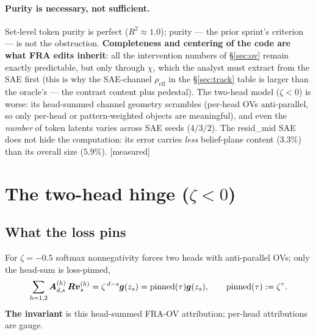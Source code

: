 \documentclass{article}
\newcommand{\gb}{\boldsymbol{g}}
\newcommand{\htag}[1]{{\normalfont\sffamily\footnotesize[#1]}}
\begin{document}
\paragraph{Purity is necessary, not sufficient.} Set-level token purity is perfect
($R^2\approx1.0$); purity --- the prior sprint's criterion --- is not the obstruction.
\textbf{Completeness and centering of the code are what FRA edits inherit}: all the
intervention numbers of \S\ref{sec:ov} remain exactly predictable, but only through
$\chi$, which the analyst must extract from the SAE first (this is why the SAE-channel
$\rho_{\mathrm{eff}}$ in the \S\ref{sec:track} table is larger than the oracle's --- the
contrast content plus pedestal). The two-head model ($\zeta<0$) is worse: its
head-summed channel geometry scrambles (per-head OVs anti-parallel, so only per-head or
pattern-weighted objects are meaningful), and even the \emph{number} of token latents
varies across SAE seeds ($4/3/2$). The resid\_mid SAE does not hide the computation:
its error carries \emph{less} belief-plane content ($3.3\%$) than its overall size
($5.9\%$). \htag{measured}

\section{The two-head hinge ($\zeta<0$)}\label{sec:twohead}

\subsection{What the loss pins}\label{sec:hingepin}

For $\zeta=-0.5$ softmax nonnegativity forces two heads with anti-parallel OVs; only
the head-sum is loss-pinned,
\begin{equation}\label{eq:headsum}
\sum_{h=1,2}\Ab^{(h)}_{d,s}\,\Rb\vb^{(h)}_s=\zeta^{\,d-s}\gb(z_s)
=\mathrm{pinned}(\tau)\gb(z_s),\qquad \mathrm{pinned}(\tau):=\zeta^\tau.
\end{equation}
\textbf{The invariant} is this head-summed FRA-OV attribution; per-head attributions
are gauge.
\end{document}
